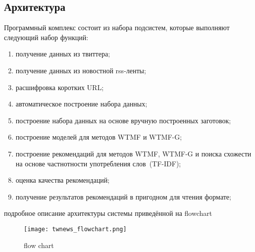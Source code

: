 \subsection{Архитектура}
    Программный комплекс состоит из набора подсистем, которые выполняют следующий набор функций:
    \begin{enumerate}
        \item получение данных из твиттера;
        \item получение данных из новостной rss-ленты;
        \item расшифровка коротких URL;
        \item автоматическое построение набора данных;
        \item построение набора данных на основе вручную построенных заготовок;
        \item построение моделей для методов WTMF и WTMF-G;
        \item построение рекомендаций для методов WTMF, WTMF-G и поиска схожести на основе частнотности употребления слов~(TF-IDF);
        \item оценка качества рекомендаций;
        \item получение результатов рекомендаций в пригодном для чтения формате;
    \end{enumerate}

    подробное описание архитектуры системы приведённой на flowchart

    \begin{sidewaysfigure}[h!]
            \center
            \texttt{[image: twnews\_flowchart.png]}
            \caption{flow chart}
            \label{pic:flowchart}
    \end{sidewaysfigure}

    \clearpage



